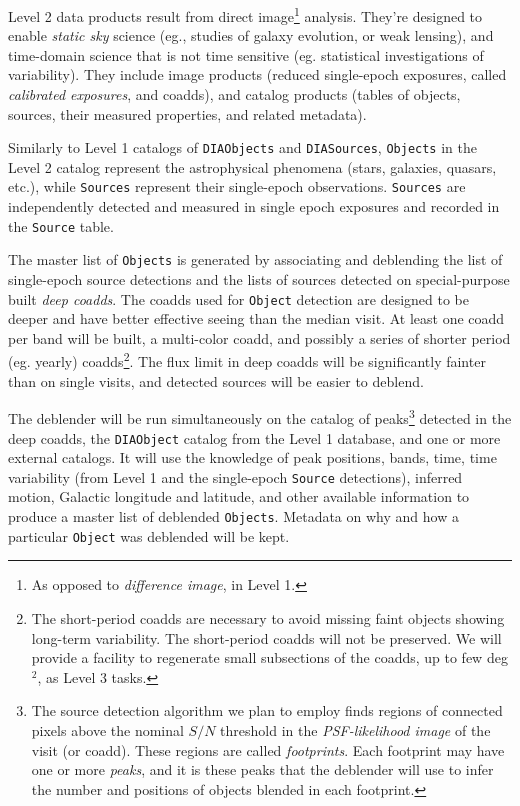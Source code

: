 \documentclass[12pt]{article}
\newcommand{\code}[1]{\texttt{#1}}
\newcommand{\DIASources}{\code{DIASources}\xspace}
\newcommand{\DIAObject}{\code{DIAObject}\xspace}
\newcommand{\DIAObjects}{\code{DIAObjects}\xspace}
\newcommand{\DB}{{Level 1 database}\xspace}
\newcommand{\Object}{\code{Object}\xspace}
\newcommand{\Objects}{\code{Objects}\xspace}
\newcommand{\Source}{\code{Source}\xspace}
\newcommand{\Sources}{\code{Sources}\xspace}
\begin{document}
Level 2 data products result from direct image\footnote{As opposed to {\em difference image}, in Level 1.} analysis. They're designed to enable {\em static sky} science (eg., studies of galaxy evolution, or weak lensing), and time-domain science that is not time sensitive (eg. statistical investigations of variability). They include image products (reduced single-epoch exposures, called {\em calibrated exposures}, and coadds), and catalog products (tables of objects, sources, their measured properties, and related metadata).

\vspace{1em}

Similarly to Level 1 catalogs of \DIAObjects and \DIASources, \Objects in the Level 2 catalog represent the astrophysical phenomena (stars, galaxies, quasars, etc.), while \Sources represent their single-epoch observations. \Sources are independently detected and measured in single epoch exposures and recorded in the \Source table. 

The master list of \Objects is generated by associating and deblending the list of single-epoch source detections and the lists of sources detected on special-purpose built {\em deep coadds}. The coadds used for \Object detection are designed to be deeper and have better effective seeing than the median visit. At least one coadd per band will be built, a multi-color coadd, and possibly a series of shorter period (eg. yearly) coadds\footnote{The short-period coadds are necessary to avoid missing faint objects showing long-term variability. The short-period coadds will not be preserved. We will provide a facility to regenerate small subsections of the coadds, up to few deg$^2$, as Level 3 tasks.}. The flux limit in deep coadds will be significantly fainter than on single visits, and detected sources will be easier to deblend.

The deblender will be run simultaneously on the catalog of peaks\footnote{The source detection algorithm we plan to employ finds regions of connected pixels above the nominal $S/N$ threshold in the {\em PSF-likelihood image} of the visit (or coadd). These regions are called {\em footprints}. Each footprint may have one or more {\em peaks}, and it is these peaks that the deblender will use to infer the number and positions of objects blended in each footprint.} detected in the deep coadds, the \DIAObject catalog from the \DB, and one or more external catalogs.  It will use the knowledge of peak positions, bands, time, time variability (from Level 1 and the single-epoch \Source detections), inferred motion, Galactic longitude and latitude, and other available information to produce a master list of deblended \Objects. Metadata on why and how a particular \Object was deblended will be kept.
\end{document}
